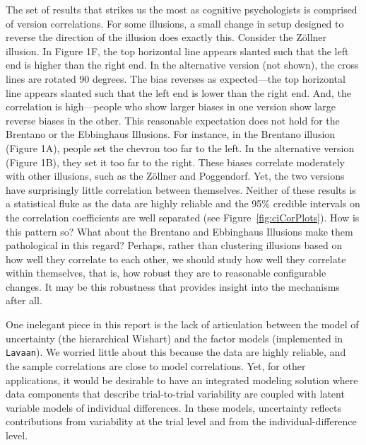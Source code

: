 \documentclass[man, 12pt]{apa7} %
\begin{document}
The set of results that strikes us the most as cognitive psychologists is comprised of version correlations.  For some illusions, a small change in setup designed to reverse the direction of the illusion does exactly this.  Consider the Zöllner illusion.  In Figure 1F, the top horizontal line appears slanted such that the left end is higher than the right end.  In the alternative version (not shown), the cross lines are rotated 90 degrees.  The bias reverses as expected---the top horizontal line appears slanted such that the left end is lower than the right end.  And, the correlation is high---people who show larger biases in one version show large reverse biases in the other.  This reasonable expectation does not hold for the Brentano or the Ebbinghaus Illusions.  For instance, in the Brentano illusion (Figure 1A), people set the chevron too far to the left.  In the alternative version (Figure 1B), they set it too far to the right.  These biases correlate moderately with other illusions, such as the Zöllner and Poggendorf.  Yet, the two versions have surprisingly little correlation between themselves.  Neither of these results is a statistical fluke as the data are highly reliable and the 95\% credible intervals on the correlation coefficients are well separated (see Figure~\ref{fig:ciCorPlots}).  How is this pattern so?  What about the Brentano and Ebbinghaus Illusions make them pathological in this regard?  Perhaps, rather than clustering illusions based on how well they correlate to each other, we should study how well they correlate within themselves, that is, how robust they are to reasonable configurable changes.  It may be this robustness that provides insight into the mechanisms after all.

One inelegant piece in this report is the lack of articulation between the model of uncertainty (the hierarchical Wishart) and the factor models (implemented in \texttt{Lavaan}).  We worried little about this because the data are highly reliable, and the sample correlations are close to model correlations.  Yet, for other applications, it would be desirable to have an integrated modeling solution where data components that describe trial-to-trial variability are coupled with latent variable models of individual differences.  In these models, uncertainty reflects contributions from variability at the trial level and from the individual-difference level.  
\end{document}
